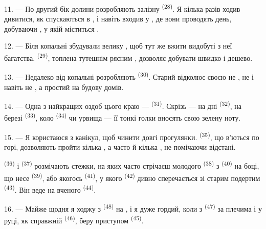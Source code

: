 11. --- По другий бік долини розробляють залізну 
\textsuperscript{(28)}. Я кілька разів ходив дивитися, як 
спускаються в , і навіть входив у , де вони
проводять день, добуваючи , у якій міститься .

12. --- Біля копальні збудували велику , щоб тут же вжити
видобуті з неї багатства.  \textsuperscript{(29)}, топлена
тутешнім рясним , дозволяє добувати  швидко і
дешево.

13. --- Недалеко від копальні розробляють 
\textsuperscript{(30)}. Старий  відколює своєю 
не , не  і навіть не , а простий
 на будову домів.

14. --- Одна з найкращих оздоб цього краю --- 
\textsuperscript{(31)}. Скрізь --- на дні  \textsuperscript{(32)}, на
березі  \textsuperscript{(33)}, коло 
\textsuperscript{(34)} чи урвища --- її тонкі голки вносять свою зелену ноту.

\VUsaut{3.0mm}
\VUsaut{3.0mm}

15. --- Я користаюся з канікул, щоб чинити довгі прогулянки. 
\textsuperscript{(35)}, що в'ються по горі, дозволяють пройти кілька
, а часто й кілька , не помічаючи відстані.

 \textsuperscript{(36)} і 
\textsuperscript{(37)} розмічають стежки, на яких часто стрічаєш молодого
 \textsuperscript{(38)} з 
\textsuperscript{(40)} на боці, що несе  \textsuperscript{(39)},
або якогось  \textsuperscript{(41)}, у якого  \textsuperscript{(42)} дивно сперечається зі старим подертим
 \textsuperscript{(43)}. Він веде на  вченого
 \textsuperscript{(44)}.

\VUsaut{3.0mm}

16. --- Майже щодня я ходжу з  \textsuperscript{(48)} на
, і я дуже гордий, коли з 
\textsuperscript{(47)} за плечима і  у руці, як справжній
 \textsuperscript{(46)}, беру приступом 
\textsuperscript{(45)}.

